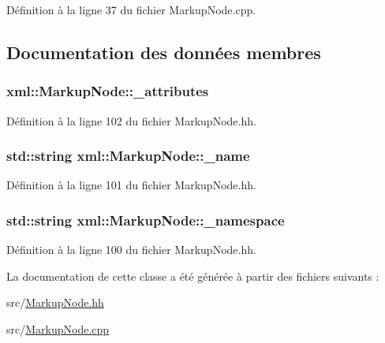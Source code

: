 Définition à la ligne 37 du fichier MarkupNode.cpp.



\subsection{Documentation des données membres}
\hypertarget{classxml_1_1_markup_node_ada616acd43f59affa41ab7a0e6f19baf}{
\subsubsection[{\_\-attributes}]{ {\bf xml::MarkupNode::\_\-attributes}}}
\label{classxml_1_1_markup_node_ada616acd43f59affa41ab7a0e6f19baf}


Définition à la ligne 102 du fichier MarkupNode.hh.

\hypertarget{classxml_1_1_markup_node_a372e14f2da008d1f2da1a5b9c8eb7600}{
\subsubsection[{\_\-name}]{\setlength{\rightskip}{0pt plus 5cm}std::string {\bf xml::MarkupNode::\_\-name}}}
\label{classxml_1_1_markup_node_a372e14f2da008d1f2da1a5b9c8eb7600}


Définition à la ligne 101 du fichier MarkupNode.hh.

\hypertarget{classxml_1_1_markup_node_a18ffd5e490fc7028b580323f5892800f}{
\subsubsection[{\_\-namespace}]{\setlength{\rightskip}{0pt plus 5cm}std::string {\bf xml::MarkupNode::\_\-namespace}}}
\label{classxml_1_1_markup_node_a18ffd5e490fc7028b580323f5892800f}


Définition à la ligne 100 du fichier MarkupNode.hh.



La documentation de cette classe a été générée à partir des fichiers suivants :\begin{DoxyCompactItemize}
\item 
src/\hyperlink{_markup_node_8hh}{MarkupNode.hh}\item 
src/\hyperlink{_markup_node_8cpp}{MarkupNode.cpp}\end{DoxyCompactItemize}
